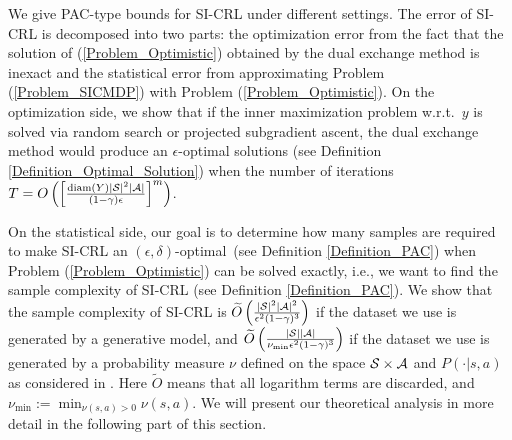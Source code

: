 We give PAC-type bounds for SI-CRL under different settings.
The error of SI-CRL is decomposed into two parts: the optimization error from the fact that the solution of (\ref{Problem_Optimistic}) obtained by the dual exchange method is inexact and the statistical error from approximating Problem (\ref{Problem_SICMDP}) with Problem (\ref{Problem_Optimistic}).
On the optimization side, we show that if the inner maximization problem w.r.t.\ $y$ is solved via random search or projected subgradient ascent, the dual exchange method would produce an $\epsilon$-optimal solutions (see Definition \ref{Definition_Optimal_Solution})
when the number of iterations $T=O\left(\left[\frac{\mathrm{diam}(Y)|{\mathcal{S}}|^2|{\mathcal{A}}|}{(1-\gamma)\epsilon}\right]^m \right)$.

On the statistical side, our goal is to determine how many samples are required to make SI-CRL an $(\epsilon, \delta)$-optimal~(see Definition \ref{Definition_PAC}) when Problem (\ref{Problem_Optimistic}) can be solved exactly, i.e., we want to find the sample complexity of SI-CRL  (see Definition \ref{Definition_PAC}).
We show that the sample complexity of SI-CRL is $\widetilde O\left(\frac{|{\mathcal{S}}|^2|{\mathcal{A}}|^2}{\epsilon^2(1-\gamma)^3}\right)$ if the dataset we use is generated by a generative model, and $\widetilde O\left(\frac{|{\mathcal{S}}||{\mathcal{A}}|}{\nu_{\min} \epsilon^2(1-\gamma)^3}\right)$ if the dataset we use is generated by a probability measure $\nu$ defined on the space ${\mathcal{S}}\times {\mathcal{A}}$ and $P(\cdot|s,a)$ as considered in \cite{chen2019information}.
Here $\widetilde O$ means that all logarithm terms are discarded, and $\nu_{\min}:=\min_{\nu(s,a)>0}\nu(s,a)$.
We will present our theoretical analysis in more detail in the following part of this section.


